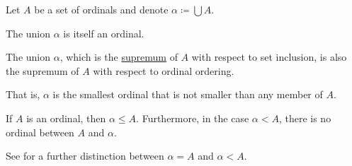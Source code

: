 \begin{proposition}\label{thm:union_of_set_of_ordinals}
  Let \( A \) be a set of ordinals and denote \( \alpha \coloneqq \bigcup A \).

  \begin{thmenum}
     The union \( \alpha \) is itself an ordinal.

     The union \( \alpha \), which is the \hyperref[def:partially_ordered_set_extremal_points/supremum_and_infimum]{supremum} of \( A \) with respect to set inclusion, is also the supremum of \( A \) with respect to ordinal ordering.

    That is, \( \alpha \) is the smallest ordinal that is not smaller than any member of \( A \).

     If \( A \) is an ordinal, then \( \alpha \leq A \). Furthermore, in the case \( \alpha < A \), there is no ordinal between \( A \) and \( \alpha \).

    See  for a further distinction between \( \alpha = A \) and \( \alpha < A \).
  \end{thmenum}
\end{proposition}
